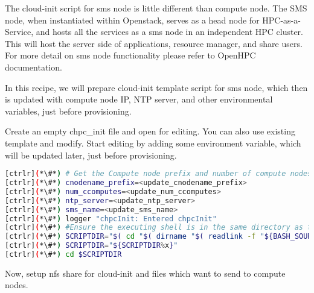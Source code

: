 	The cloud-init script for sms node is little different than compute node. The SMS node, when instantiated within Openstack, serves as a head node for HPC-as-a-Service, and hosts all the services as a sms node in an independent HPC cluster. This will host the server side of applications, resource manager, and share users. For more detail on sms node functionality please refer to OpenHPC documentation.

	In this recipe, we will prepare cloud-init template script for sms node, which then is updated with compute node IP, NTP server, and other environmental variables, just before provisioning. 

	Create an empty chpc\_init file and open for editing. You can also use existing template and modify. Start editing by adding some environment variable, which will be updated later, just before provisioning.


\begin{lstlisting}[language=bash,keywords={}]
[ctrlr](*\#*) # Get the Compute node prefix and number of compute nodes
[ctrlr](*\#*) cnodename_prefix=<update_cnodename_prefix>
[ctrlr](*\#*) num_ccomputes=<update_num_ccomputes>
[ctrlr](*\#*) ntp_server=<update_ntp_server>
[ctrlr](*\#*) sms_name=<update_sms_name>
[ctrlr](*\#*) logger "chpcInit: Entered chpcInit"
[ctrlr](*\#*) #Ensure the executing shell is in the same directory as the script.
[ctrlr](*\#*) SCRIPTDIR="$( cd "$( dirname "$( readlink -f "${BASH_SOURCE[0]}" )" )" && pwd -P && echo x)"
[ctrlr](*\#*) SCRIPTDIR="${SCRIPTDIR%x}"
[ctrlr](*\#*) cd $SCRIPTDIR

\end{lstlisting} 

	Now, setup nfs share for cloud-init and files which want to send to compute nodes.


